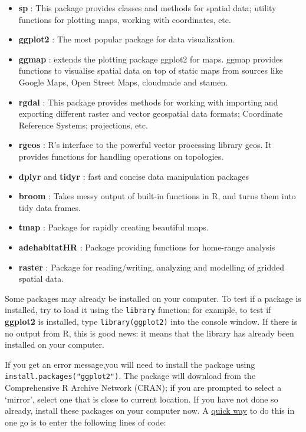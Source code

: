 \documentclass[]{article}
\providecommand{\tightlist}{%
  \setlength{\itemsep}{0pt}\setlength{\parskip}{0pt}}
\begin{document}
\begin{itemize}
\tightlist
\item
  \textbf{sp} : This package provides classes and methods for spatial
  data; utility functions for plotting maps, working with coordinates,
  etc.
\item
  \textbf{ggplot2} : The most popular package for data visualization.
\item
  \textbf{ggmap} : extends the plotting package ggplot2 for maps. ggmap
  provides functions to visualise spatial data on top of static maps
  from sources like Google Maps, Open Street Maps, cloudmade and stamen.
\item
  \textbf{rgdal} : This package provides methods for working with
  importing and exporting different raster and vector geospatial data
  formats; Coordinate Reference Systems; projections, etc.
\item
  \textbf{rgeos} : R's interface to the powerful vector processing
  library geos. It provides functions for handling operations on
  topologies.
\item
  \textbf{dplyr} and \textbf{tidyr} : fast and concise data manipulation
  packages
\item
  \textbf{broom} : Takes messy output of built-in functions in R, and
  turns them into tidy data frames.
\item
  \textbf{tmap} : Package for rapidly creating beautiful maps.
\item
  \textbf{adehabitatHR} : Package providing functions for home-range
  analysis
\item
  \textbf{raster} : Package for reading/writing, analyzing and modelling
  of gridded spatial data.
\end{itemize}

Some packages may already be installed on your computer. To test if a
package is installed, try to load it using the \texttt{library}
function; for example, to test if \textbf{ggplot2} is installed, type
\texttt{library(ggplot2)} into the console window. If there is no output
from R, this is good news: it means that the library has already been
installed on your computer.

If you get an error message,you will need to install the package using
\texttt{install.packages("ggplot2")}. The package will download from the
Comprehensive R Archive Network (CRAN); if you are prompted to select a
`mirror', select one that is close to current location. If you have not
done so already, install these packages on your computer now. A
\href{http://stackoverflow.com/questions/8175912/load-multiple-packages-at-once}{quick
way} to do this in one go is to enter the following lines of code:
\end{document}
